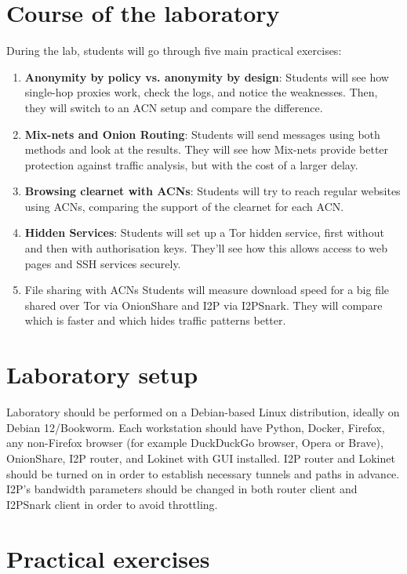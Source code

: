 \section{Course of the laboratory}
During the lab, students will go through five main practical exercises:
\begin{enumerate}
    \item \textbf{Anonymity by policy vs. anonymity by design}: Students will see how single-hop proxies work, check the logs, and notice the weaknesses. Then, they will switch to an ACN setup and compare the difference.
\item \textbf{Mix-nets and Onion Routing}: Students will send messages using both methods and look at the results. They will see how Mix-nets provide better protection against traffic analysis, but with the cost of a larger delay.
\item \textbf{Browsing clearnet with ACNs}: Students will try to reach regular websites using ACNs, comparing the support of the clearnet for each ACN.
\item \textbf{Hidden Services}: Students will set up a Tor hidden service, first without and then with authorisation keys. They’ll see how this allows access to web pages and SSH services securely.
\item File sharing with ACNs
Students will measure download speed for a big file shared over Tor via OnionShare and I2P via I2PSnark. They will compare which is faster and which hides traffic patterns better.
\end{enumerate}

\section{Laboratory setup}
Laboratory should be performed on a Debian-based Linux distribution, ideally on Debian 12/Bookworm. Each workstation should have Python, Docker, Firefox, any non-Firefox browser (for example DuckDuckGo browser, Opera or Brave), OnionShare, I2P router, and Lokinet with GUI installed. I2P router and Lokinet should be turned on in order to establish necessary tunnels and paths in advance. I2P's bandwidth parameters should be changed in both router client and I2PSnark client in order to avoid throttling.

\section{Practical exercises}

